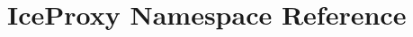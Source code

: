\hypertarget{namespace_ice_proxy}{
\section{IceProxy Namespace Reference}
\label{namespace_ice_proxy}
}

